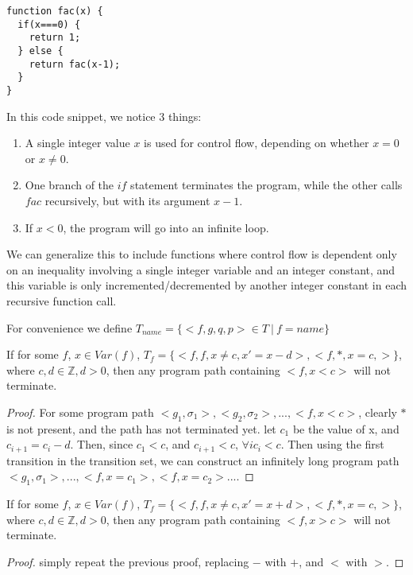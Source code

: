 \begin{lstlisting}
function fac(x) {
  if(x===0) {
    return 1;
  } else {
    return fac(x-1);
  }
}
\end{lstlisting}

In this code snippet, we notice 3 things:
\begin{enumerate}
  \item A single integer value $x$ is used for control flow, depending on whether $x=0$ or $x\neq 0$.
  \item One branch of the $if$ statement terminates the program, while the other calls $fac$ recursively, but with its argument $x-1$.
  \item If $x<0$, the program will go into an infinite loop.
\end{enumerate}

We can generalize this to include functions where control flow is dependent only on an inequality involving a single integer variable and an integer constant, and this variable is only incremented/decremented by another integer constant in each recursive function call.

For convenience we define $T_{name}=\{<f,g,q,p>\in T~|~f=name\}$

\begin{theorem}
  If for some $f$, $x \in Var(f)$, $T_f = \{<f,f,x\neq c,x'=x-d>,<f,*,x=c, >\}$, where $c, d \in \mathbb{Z}, d > 0$, then any program path containing $<f, x < c >$ will not terminate.
\end{theorem}

\begin{proof}
   For some program path $<g_1,\sigma_1>, <g_2,\sigma_2>,..., <f,x < c>$, clearly $*$ is not present, and the path has not terminated yet.
   let $c_1$ be the value of x, and $c_{i+1} = c_i - d$. Then, since $c_1 < c$, and $c_{i+1} < c$, $\forall i c_i < c$.
   Then using the first transition in the transition set, we can construct an infinitely long program path $<g_1, \sigma_1>, ..., <f, x=c_1 >, <f, x=c_2> ...$.
  
\end{proof}

\begin{corollary}
  If for some $f$, $x \in Var(f)$, $T_f = \{<f,f,x\neq c,x'=x+d>,<f,*,x=c, >\}$, where $c, d \in \mathbb{Z}, d > 0$, then any program path containing $<f, x > c >$ will not terminate.
\end{corollary}

\begin{proof}
  simply repeat the previous proof, replacing $-$ with $+$, and $<$ with $>$.
\end{proof}
  
